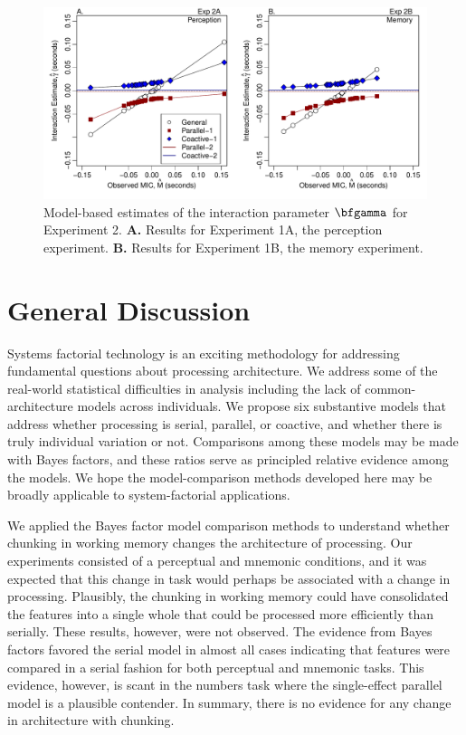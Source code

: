 \documentclass[fignum,nobf,man]{apa}
\begin{document}
\begin{figure}
\centering
\includegraphics[width=6in]{jonFigures/jEst2.pdf}
\caption{Model-based estimates of the interaction parameter $\bfgamma$ for Experiment 2.  {\bf A.} Results for Experiment 1A, the perception experiment.  {\bf B.} Results for Experiment 1B, the memory experiment.}
\label{est2}
\end{figure}




\section{General Discussion}
Systems factorial technology is an exciting methodology for addressing fundamental questions about processing architecture.  We address some of the real-world statistical difficulties in analysis including the lack of common-architecture models across individuals.  We propose six substantive models that address whether processing is serial, parallel, or coactive, and whether there is truly individual variation or not.  Comparisons among these models may be made with Bayes factors, and these ratios serve as principled relative evidence among the models.   We hope the model-comparison methods developed here may be broadly applicable to system-factorial applications.

We applied the Bayes factor model comparison methods to understand whether chunking in working memory changes the architecture of processing.  Our experiments consisted of a perceptual and mnemonic conditions, and it was expected that this change in task would perhaps be associated with a change in processing.  Plausibly, the chunking in working memory could have consolidated the features into a single whole that could be processed more efficiently than serially.  These results, however, were not observed.  The evidence from Bayes factors favored the serial model in almost all cases indicating that features were compared in a serial fashion for both perceptual and mnemonic tasks.  This evidence, however, is scant  in the numbers task where the single-effect parallel model is a plausible contender.  In summary, there is no evidence for any change in architecture with chunking.
\end{document}

